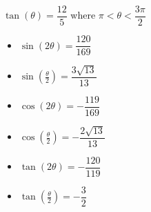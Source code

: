 {$\tan(\theta) = \dfrac{12}{5}$ where $\pi < \theta < \dfrac{3\pi}{2}$}
{
\begin{itemize}
\item $\sin(2\theta) = \dfrac{120}{169}$
\item $\sin\left(\frac{\theta}{2}\right) = \dfrac{3\sqrt{13}}{13}$
\item $\cos(2\theta) = -\dfrac{119}{169}$
\item $\cos\left(\frac{\theta}{2}\right) = -\dfrac{2\sqrt{13}}{13}$
\item $\tan(2\theta) = -\dfrac{120}{119}$
\item $\tan\left(\frac{\theta}{2}\right) = -\dfrac{3}{2}$
\end{itemize}
}